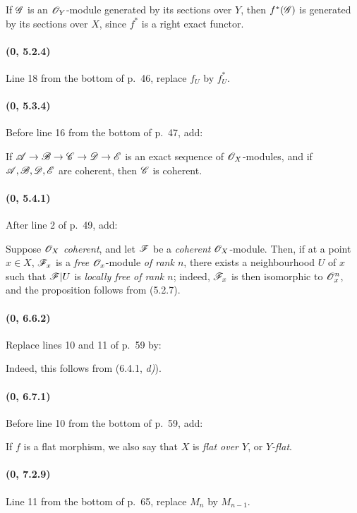 If $\mathscr{G}$ is an $\mathscr{O}_Y$-module generated by its sections over
$Y$, then $f^*(\mathscr{G})$ is generated by its sections over
$X$, since $f^*$ is a right exact functor.

\paragraph{(\textbf{0}, 5.2.4)}
Line 18 from the bottom of p.~46, replace $f_U$ by $f_U^*$.

\paragraph{(\textbf{0}, 5.3.4)}
Before line 16 from the bottom of p.~47, add:

If $\mathscr{A}\to\mathscr{B}\to\mathscr{C}\to\mathscr{D}\to\mathscr{E}$
is an exact sequence of $\mathscr{O}_X$-modules, and if
$\mathscr{A},\mathscr{B},\mathscr{D},\mathscr{E}$ are coherent, then $\mathscr{C}$ is
coherent.

\paragraph{(\textbf{0}, 5.4.1)}
After line 2 of p.~49, add:

Suppose $\mathscr{O}_X$ \emph{coherent}, and let $\mathscr{F}$ be a \emph{coherent}
$\mathscr{O}_X$-module. Then, if at a point $x\in X$, $\mathscr{F}_x$ is a \emph{free}
$\mathscr{O}_x$-module \emph{of rank $n$}, there exists a neighbourhood $U$ of $x$
such that $\mathscr{F}|U$ is \emph{locally free of rank $n$}; indeed,
$\mathscr{F}_x$ is then isomorphic to $\mathscr{O}_x^n$, and the proposition follows
from (5.2.7).

\paragraph{(\textbf{0}, 6.6.2)}
Replace lines 10 and 11 of p.~59 by:

Indeed, this follows from (6.4.1, \emph{d)}).

\paragraph{(\textbf{0}, 6.7.1)}
Before line 10 from the bottom of p.~59, add:

If $f$ is a flat morphism, we also say that $X$ is \emph{flat over
$Y$}, or \emph{$Y$-flat}.

\paragraph{(\textbf{0}, 7.2.9)}
Line 11 from the bottom of p.~65, replace $M_n$ by $M_{n-1}$.

